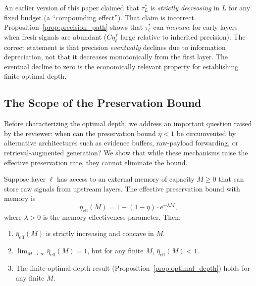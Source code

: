 \begin{remark}\label{rem:compounding_qualitative}
An earlier version of this paper claimed that $\tau^*_L$ is \emph{strictly decreasing} in $L$ for any fixed budget (a ``compounding effect''). That claim is incorrect. Proposition~\ref{prop:precision_path} shows that $\tau^*_\ell$ can \emph{increase} for early layers when fresh signals are abundant ($C\eta_\ell^{\,\ell}$ large relative to inherited precision). The correct statement is that precision \emph{eventually} declines due to information depreciation, not that it decreases monotonically from the first layer. The eventual decline to zero is the economically relevant property for establishing finite optimal depth.
\end{remark}

\subsection{The Scope of the Preservation Bound}
\label{subsec:preservation_scope}

Before characterizing the optimal depth, we address an important question raised by the reviewer: when can the preservation bound $\bar{\eta} < 1$ be circumvented by alternative architectures such as evidence buffers, raw-payload forwarding, or retrieval-augmented generation? We show that while these mechanisms raise the effective preservation rate, they cannot eliminate the bound.

\begin{proposition}\label{prop:memory_bound}
Suppose layer $\ell$ has access to an external memory of capacity $M \geq 0$ that can store raw signals from upstream layers. The effective preservation bound with memory is
\begin{equation}\label{eq:memory_eta}
\bar{\eta}_{\text{eff}}(M) = 1 - (1 - \bar{\eta}) \cdot e^{-\lambda M},
\end{equation}
where $\lambda > 0$ is the memory effectiveness parameter. Then:
\begin{enumerate}[label=(\roman*)]
\item $\bar{\eta}_{\text{eff}}(M)$ is strictly increasing and concave in $M$.
\item $\lim_{M \to \infty} \bar{\eta}_{\text{eff}}(M) = 1$, but for any finite $M$, $\bar{\eta}_{\text{eff}}(M) < 1$.
\item The finite-optimal-depth result (Proposition~\ref{prop:optimal_depth}) holds for any finite $M$.
\end{enumerate}
\end{proposition}

